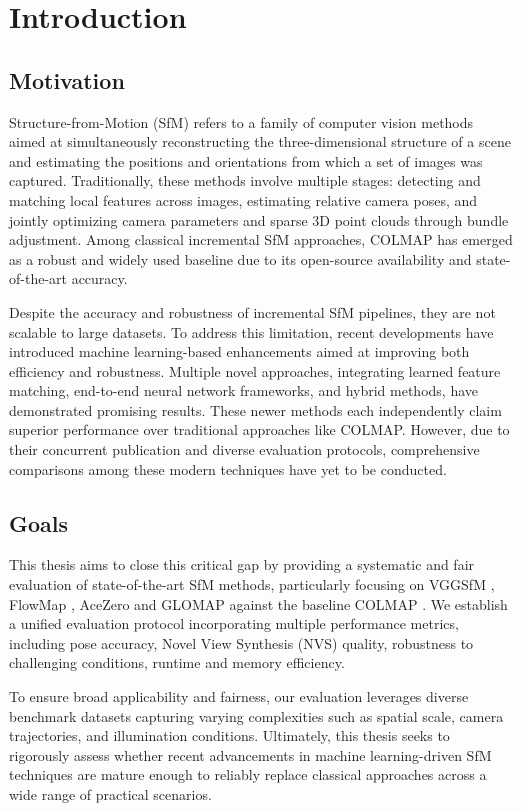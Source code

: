 \chapter{Introduction}\label{chap:introduction}

\section{Motivation}

Structure-from-Motion (SfM) refers to a family of computer vision methods aimed at simultaneously reconstructing the three-dimensional structure of a scene and estimating the positions and orientations from which a set of images was captured. 
Traditionally, these methods involve multiple stages: detecting and matching local features across images, estimating relative camera poses, and jointly optimizing camera parameters and sparse 3D point clouds through bundle adjustment. 
Among classical incremental SfM approaches, COLMAP \cite{schoenberger2016sfm} has emerged as a robust and widely used baseline due to its open-source availability and state-of-the-art accuracy.

Despite the accuracy and robustness of incremental SfM pipelines, they are not scalable to large datasets.
To address this limitation, recent developments have introduced machine learning-based enhancements aimed at improving both efficiency and robustness. 
Multiple novel approaches, integrating learned feature matching, end-to-end neural network frameworks, and hybrid methods, have demonstrated promising results. 
These newer methods each independently claim superior performance over traditional approaches like COLMAP. However, due to their concurrent publication and diverse evaluation protocols, comprehensive comparisons among these modern techniques have yet to be conducted.

\section{Goals}

This thesis aims to close this critical gap by providing a systematic and fair evaluation of state-of-the-art SfM methods, particularly focusing on VGGSfM \cite{wang2023vggsfm}, FlowMap \cite{smith24flowmap}, AceZero \cite{brachmann2024acezero} and GLOMAP \cite{pan2024glomap} against the baseline COLMAP \cite{schoenberger2016sfm}.
We establish a unified evaluation protocol incorporating multiple performance metrics, including pose accuracy, Novel View Synthesis (NVS) quality, robustness to challenging conditions, runtime and memory efficiency.

To ensure broad applicability and fairness, our evaluation leverages diverse benchmark datasets capturing varying complexities such as spatial scale, camera trajectories, and illumination conditions. 
Ultimately, this thesis seeks to rigorously assess whether recent advancements in machine learning-driven SfM techniques are mature enough to reliably replace classical approaches across a wide range of practical scenarios.
